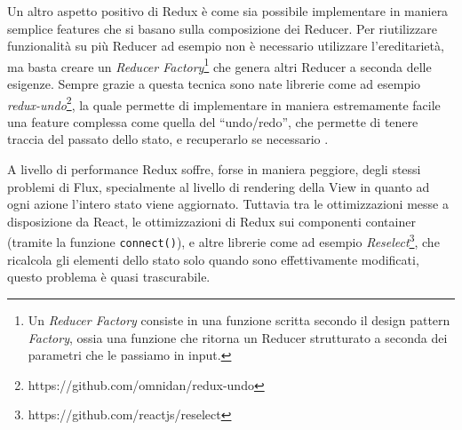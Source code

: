 Un altro aspetto positivo di Redux è come sia possibile implementare in maniera semplice features che si basano sulla composizione dei Reducer. Per riutilizzare funzionalità su più Reducer ad esempio non è necessario utilizzare l'ereditarietà, ma basta creare un \textit{Reducer Factory}\footnote{Un \textit{Reducer Factory} consiste in una funzione scritta secondo il design pattern \textit{Factory}, ossia una funzione che ritorna un Reducer strutturato a seconda dei parametri che le passiamo in input.} che genera altri Reducer a seconda delle esigenze.
Sempre grazie a questa tecnica sono nate librerie come ad esempio \textit{redux-undo}\footnote{https://github.com/omnidan/redux-undo}, la quale permette di implementare in maniera estremamente facile una feature complessa come quella del “undo/redo”, che permette di tenere traccia del passato dello stato, e recuperarlo se necessario \cite{AbramovOnReduxVsFlux}.

A livello di performance Redux soffre, forse in maniera peggiore, degli stessi problemi di Flux, specialmente al livello di rendering della View in quanto ad ogni azione l'intero stato viene aggiornato. Tuttavia tra le ottimizzazioni messe a disposizione da React, le ottimizzazioni di Redux sui componenti container (tramite la funzione \texttt{connect()}), e altre librerie come ad esempio \textit{Reselect}\footnote{https://github.com/reactjs/reselect}, che ricalcola gli elementi dello stato solo quando sono effettivamente modificati, questo problema è quasi trascurabile.